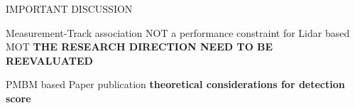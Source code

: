 \documentclass[aspectratio=169,xcolor=dvipsnames]{beamer}
\begin{document}
\begin{frame}{IMPORTANT DISCUSSION}
\begin{block}{Measurement-Track association NOT a performance constraint for Lidar based MOT}
    \textbf{THE RESEARCH DIRECTION NEED TO BE REEVALUATED}
\end{block}

\begin{block}{PMBM based Paper publication}
    \textbf{theoretical considerations for detection score}
\end{block}

\end{frame}
\end{document}
